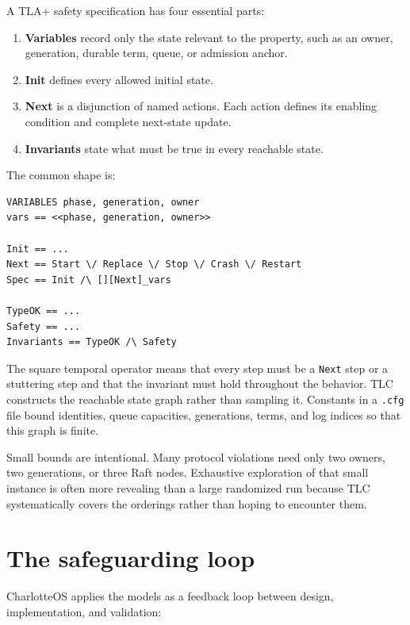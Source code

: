 A TLA+ safety specification has four essential parts:

\begin{enumerate}
    \item \textbf{Variables} record only the state relevant to the property,
        such as an owner, generation, durable term, queue, or admission anchor.
    \item \textbf{Init} defines every allowed initial state.
    \item \textbf{Next} is a disjunction of named actions. Each action defines
        its enabling condition and complete next-state update.
    \item \textbf{Invariants} state what must be true in every reachable state.
\end{enumerate}

The common shape is:

\begin{verbatim}
VARIABLES phase, generation, owner
vars == <<phase, generation, owner>>

Init == ...
Next == Start \/ Replace \/ Stop \/ Crash \/ Restart
Spec == Init /\ [][Next]_vars

TypeOK == ...
Safety == ...
Invariants == TypeOK /\ Safety
\end{verbatim}

The square temporal operator means that every step must be a \texttt{Next}
step or a stuttering step and that the invariant must hold throughout the
behavior. TLC constructs the reachable state graph rather than sampling it.
Constants in a \texttt{.cfg} file bound identities, queue capacities,
generations, terms, and log indices so that this graph is finite.

Small bounds are intentional. Many protocol violations need only two owners,
two generations, or three Raft nodes. Exhaustive exploration of that small
instance is often more revealing than a large randomized run because TLC
systematically covers the orderings rather than hoping to encounter them.

\section{The safeguarding loop}

CharlotteOS applies the models as a feedback loop between design,
implementation, and validation:

